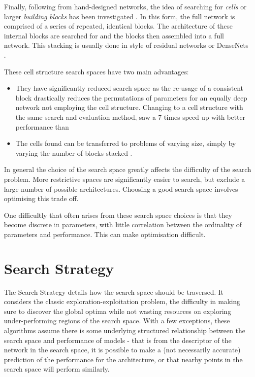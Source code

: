 Finally, following from hand-designed networks, the idea of searching for \textit{cells} or larger \textit{building blocks} has been investigated \citep{Szegedy2015,He2015}. In this form, the full network is comprised of a series of repeated, identical blocks. The architecture of these internal blocks are searched for and the blocks then assembled into a full network. This stacking is usually done in style of residual networks \citep{He2015} or DenseNets \citep{Huang2017}.

These cell structure search spaces have two main advantages:
\begin{itemize}
	\item They have significantly reduced search space as the re-usage of a consistent block drastically reduces the permutations of parameters for an equally deep network not employing the cell structure. Changing to a cell structure with the same search and evaluation method, \citet{zoph2018learning} saw a 7 times speed up with better performance than \citet{zoph2016neural}
	\item The cells found can be transferred to problems of varying size, simply by varying the number of blocks stacked \citep{zoph2016neural}.
\end{itemize}

In general the choice of the search space greatly affects the difficulty of the search problem. More restrictive spaces are significantly easier to search, but exclude a large number of possible architectures. Choosing a good search space involves optimising this trade off.

One difficultly that often arises from these search space choices is that they become discrete in parameters, with little correlation between the ordinality of parameters and performance. This can make optimisation difficult.

\section{Search Strategy}

The Search Strategy details how the search space should be traversed. It considers the classic exploration-exploitation problem, the difficulty in making sure to discover the global optima while not wasting resources on exploring under-performing regions of the search space. With a few exceptions, these algorithms assume there is some underlying structured relationship between the search space and performance of models - that is from the descriptor of the network in the search space, it is possible to make a (not necessarily accurate) prediction of the performance for the architecture, or that nearby points in the search space will perform similarly.

